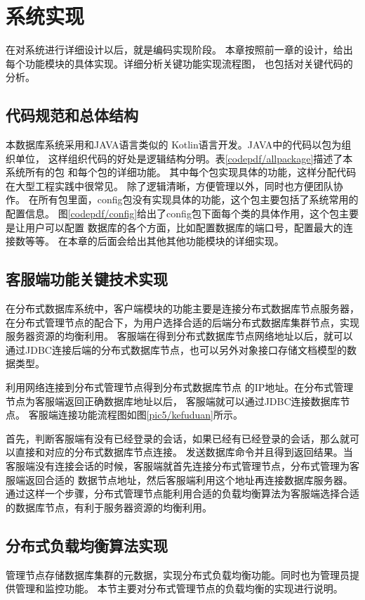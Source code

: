 
\chapter{系统实现}
在对系统进行详细设计以后，就是编码实现阶段。
本章按照前一章的设计，给出每个功能模块的具体实现。详细分析关键功能实现流程图，
也包括对关键代码的分析。
\section{代码规范和总体结构}
本数据库系统采用和JAVA语言类似的
Kotlin语言开发。JAVA中的代码以包为组织单位，
这样组织代码的好处是逻辑结构分明。表\ref{codepdf/allpackage}描述了本系统所有的包
和每个包的详细功能。
其中每个包实现具体的功能，这样分配代码在大型工程实践中很常见。
除了逻辑清晰，方便管理以外，同时也方便团队协作。
在所有包里面，config包没有实现具体的功能，这个包主要包括了系统常用的配置信息。
图\ref{codepdf/config}给出了config包下面每个类的具体作用，这个包主要是让用户可以配置
数据库的各个方面，比如配置数据库的端口号，配置最大的连接数等等。
在本章的后面会给出其他其他功能模块的详细实现。
\section{客服端功能关键技术实现}
在分布式数据库系统中，客户端模块的功能主要是连接分布式数据库节点服务器，在分布式管理节点的配合下，为用户选择合适的后端分布式数据库集群节点，实现服务器资源的均衡利用。
客服端在得到分布式数据库节点网络地址以后，就可以通过JDBC连接后端的分布式数据库节点，也可以另外对象接口存储文档模型的数据类型。

利用网络连接到分布式管理节点得到分布式数据库节点
的IP地址。在分布式管理节点为客服端返回正确数据库地址以后，
客服端就可以通过JDBC连接数据库节点。
客服端连接功能流程图如图\ref{pic5/kefuduan}所示。

首先，判断客服端有没有已经登录的会话，如果已经有已经登录的会话，那么就可以直接和对应的分布式数据库节点连接。
发送数据库命令并且得到返回结果。当客服端没有连接会话的时候，客服端就首先连接分布式管理节点，分布式管理为客服端返回合适的
数据节点地址，然后客服端利用这个地址再连接数据库服务器。
通过这样一个步骤，分布式管理节点能利用合适的负载均衡算法为客服端选择合适的数据库节点，有利于服务器资源的均衡利用。
\section{分布式负载均衡算法实现}
管理节点存储数据库集群的元数据，实现分布式负载均衡功能。同时也为管理员提供管理和监控功能。
本节主要对分布式管理节点的负载均衡的实现进行说明。

